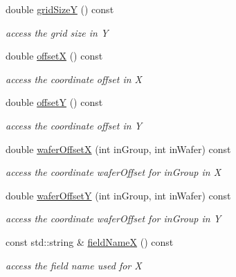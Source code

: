 \begin{DoxyCompactItemize}
double \hyperlink{class_d_d4hep_1_1_geometry_1_1_wafer_grid_x_y_a38bb2eb8abf6faec5aea2f543b342c11}{gridSizeY} () const 
\begin{DoxyCompactList}\small\item\em access the grid size in Y \item\end{DoxyCompactList}\item 
double \hyperlink{class_d_d4hep_1_1_geometry_1_1_wafer_grid_x_y_acdbedcd3bc0cf0df35ef8280d26af614}{offsetX} () const 
\begin{DoxyCompactList}\small\item\em access the coordinate offset in X \item\end{DoxyCompactList}\item 
double \hyperlink{class_d_d4hep_1_1_geometry_1_1_wafer_grid_x_y_afc6458e397147d5189a777c5e9450be7}{offsetY} () const 
\begin{DoxyCompactList}\small\item\em access the coordinate offset in Y \item\end{DoxyCompactList}\item 
double \hyperlink{class_d_d4hep_1_1_geometry_1_1_wafer_grid_x_y_a587a683c8e578dfe12d5d8ebbcf02633}{waferOffsetX} (int inGroup, int inWafer) const 
\begin{DoxyCompactList}\small\item\em access the coordinate waferOffset for inGroup in X \item\end{DoxyCompactList}\item 
double \hyperlink{class_d_d4hep_1_1_geometry_1_1_wafer_grid_x_y_a010307d07b0a6a9d9cc3d5a8655864b7}{waferOffsetY} (int inGroup, int inWafer) const 
\begin{DoxyCompactList}\small\item\em access the coordinate waferOffset for inGroup in Y \item\end{DoxyCompactList}\item 
const std::string \& \hyperlink{class_d_d4hep_1_1_geometry_1_1_wafer_grid_x_y_af40e5b49f57761abb0c6a100257655f8}{fieldNameX} () const 
\begin{DoxyCompactList}\small\item\em access the field name used for X \item\end{DoxyCompactList}\item 

\end{DoxyCompactItemize}
